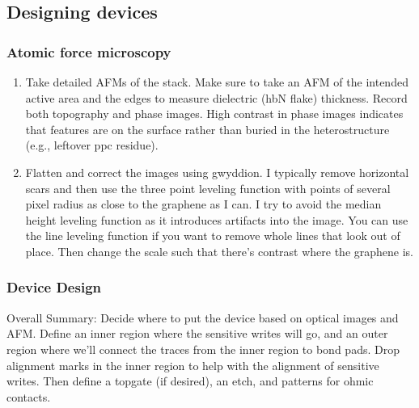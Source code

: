 \begin{appendices}
\section{Designing devices}

\subsubsection{Atomic force microscopy}
\begin{enumerate}
	\item Take detailed AFMs of the stack. Make sure to take an AFM of the intended active area and the edges to measure dielectric (hbN flake) thickness. Record both topography and phase images. High contrast in phase images indicates that features are on the surface rather than buried in the heterostructure (e.g., leftover ppc residue).
	\item Flatten and correct the images using gwyddion. I typically remove horizontal scars and then use the three point leveling function with points of several pixel radius as close to the graphene as I can. I try to avoid the median height leveling function as it introduces artifacts into the image. You can use the line leveling function if you want to remove whole lines that look out of place. Then change the scale such that there’s contrast where the graphene is.
\end{enumerate}

\subsubsection{Device Design}
Overall Summary: Decide where to put the device based on optical images and AFM. Define an inner region where the sensitive writes will go, and an outer region where we’ll connect the traces from the inner region to bond pads. Drop alignment marks in the inner region to help with the alignment of sensitive writes. Then define a topgate (if desired), an etch, and patterns for ohmic contacts.


\end{appendices}
